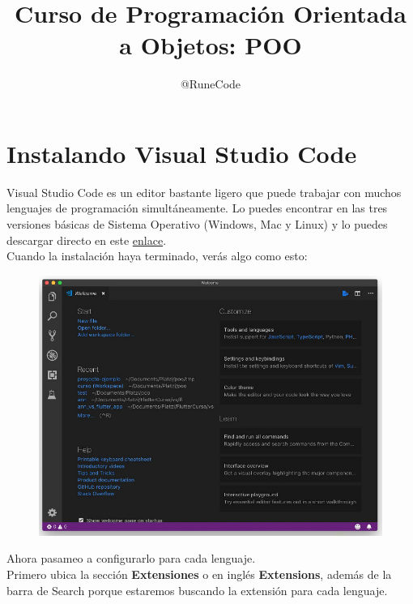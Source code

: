 \documentclass{article}
\title{Curso de Programación Orientada a Objetos: POO}
\author{@RuneCode}
\begin{document}


\section{Instalando Visual Studio Code}%
Visual Studio Code es un editor bastante ligero que puede trabajar con muchos
lenguajes de programación simultáneamente. Lo puedes encontrar en las tres
versiones básicas de Sistema Operativo (Windows, Mac y Linux) y lo puedes
descargar directo en este
\href{https://code.visualstudio.com/download}{enlace}.\\

Cuando la instalación haya terminado, verás algo como esto:

\begin{figure}[h!]
  \centering
  \includegraphics[scale=0.65]{./Pictures/022_vscode.png}
\end{figure}

Ahora pasameo a configurarlo para cada lenguaje.\\

Primero ubica la sección \textbf{Extensiones} o en inglés \textbf{Extensions},
además de la barra de Search porque estaremos buscando la extensión para cada
lenguaje.
\end{document}

